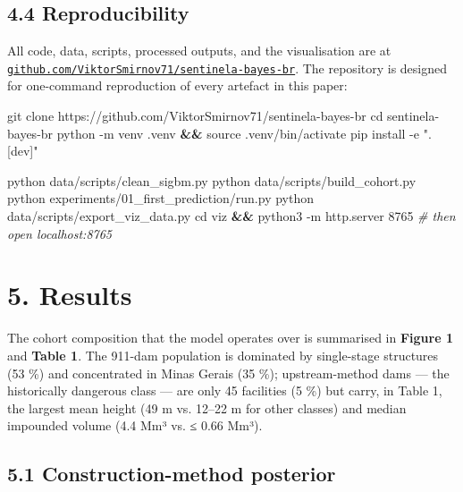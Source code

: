 \documentclass[
  11pt]{article}
\newenvironment{Shaded}{}{}
\newcommand{\AttributeTok}[1]{\textcolor[rgb]{0.49,0.56,0.16}{#1}}
\newcommand{\BuiltInTok}[1]{\textcolor[rgb]{0.00,0.50,0.00}{#1}}
\newcommand{\CommentTok}[1]{\textcolor[rgb]{0.38,0.63,0.69}{\textit{#1}}}
\newcommand{\ExtensionTok}[1]{#1}
\newcommand{\FunctionTok}[1]{\textcolor[rgb]{0.02,0.16,0.49}{#1}}
\newcommand{\KeywordTok}[1]{\textcolor[rgb]{0.00,0.44,0.13}{\textbf{#1}}}
\newcommand{\NormalTok}[1]{#1}
\newcommand{\StringTok}[1]{\textcolor[rgb]{0.25,0.44,0.63}{#1}}
\begin{document}
\subsection{4.4 Reproducibility}\label{reproducibility}

All code, data, scripts, processed outputs, and the visualisation are at
\href{https://github.com/ViktorSmirnov71/sentinela-bayes-br}{\texttt{github.com/ViktorSmirnov71/sentinela-bayes-br}}.
The repository is designed for one-command reproduction of every
artefact in this paper:

\begin{Shaded}
\begin{Highlighting}[]
\FunctionTok{git}\NormalTok{ clone https://github.com/ViktorSmirnov71/sentinela{-}bayes{-}br}
\BuiltInTok{cd}\NormalTok{ sentinela{-}bayes{-}br}
\ExtensionTok{python} \AttributeTok{{-}m}\NormalTok{ venv .venv }\KeywordTok{\&\&} \BuiltInTok{source}\NormalTok{ .venv/bin/activate}
\ExtensionTok{pip}\NormalTok{ install }\AttributeTok{{-}e} \StringTok{".[dev]"}

\ExtensionTok{python}\NormalTok{ data/scripts/clean\_sigbm.py}
\ExtensionTok{python}\NormalTok{ data/scripts/build\_cohort.py}
\ExtensionTok{python}\NormalTok{ experiments/01\_first\_prediction/run.py}
\ExtensionTok{python}\NormalTok{ data/scripts/export\_viz\_data.py}
\BuiltInTok{cd}\NormalTok{ viz }\KeywordTok{\&\&} \ExtensionTok{python3} \AttributeTok{{-}m}\NormalTok{ http.server 8765  }\CommentTok{\# then open localhost:8765}
\end{Highlighting}
\end{Shaded}

\section{5. Results}\label{results}

The cohort composition that the model operates over is summarised in
\textbf{Figure 1} and \textbf{Table 1}. The 911-dam population is
dominated by single-stage structures (53 \%) and concentrated in Minas
Gerais (35 \%); upstream-method dams --- the historically dangerous
class --- are only 45 facilities (5 \%) but carry, in Table 1, the
largest mean height (49 m vs. 12--22 m for other classes) and median
impounded volume (4.4 Mm³ vs. ≤ 0.66 Mm³).

\subsection{5.1 Construction-method
posterior}\label{construction-method-posterior}
\end{document}

